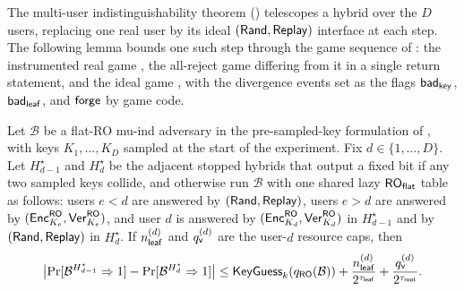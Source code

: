 The multi-user indistinguishability theorem () telescopes a
hybrid over the $D$ users, replacing one real user by its ideal
$(\mathsf{Rand},\mathsf{Replay})$ interface at each step. The following lemma bounds one such
step through the game sequence of : the
instrumented real game \Greal{}, the all-reject game \Grej{} differing from
it in a single return statement, and the ideal game \Gideal{}, with the
divergence events set as the flags $\mathsf{bad}_{\mathsf{key}}$, $\mathsf{bad}_{\mathsf{leaf}}$, and $\mathsf{forge}$ by
game code.

\begin{lemma}
\label{lem:mu-adjacent-hybrid}
Let $\mathcal{B}$ be a flat-RO mu-ind adversary in the pre-sampled-key
formulation of , with keys
$K_1,\dots,K_D$ sampled at the start of the experiment. Fix
$d \in \{1,\dots,D\}$. Let $H_{d-1}^\star$ and $H_d^\star$ be the
adjacent stopped hybrids that output a fixed bit if any two sampled keys
collide, and otherwise run $\mathcal{B}$ with one shared lazy
$\mathsf{RO}_{\mathsf{flat}}$ table as follows: users $e < d$ are answered by
$(\mathsf{Rand},\mathsf{Replay})$, users $e > d$ are answered by
$(\mathsf{Enc}_{K_e}^{\mathsf{RO}},\mathsf{Ver}_{K_e}^{\mathsf{RO}})$, and user $d$ is answered by
$(\mathsf{Enc}_{K_d}^{\mathsf{RO}},\mathsf{Ver}_{K_d}^{\mathsf{RO}})$ in $H_{d-1}^\star$ and by
$(\mathsf{Rand},\mathsf{Replay})$ in $H_d^\star$. If $n_{\mathsf{leaf}}^{(d)}$ and $q_{\mathsf{v}}^{(d)}$
are the user-$d$ resource caps, then
\[
  \bigl|\Pr[\mathcal{B}^{H_{d-1}^\star} \Rightarrow 1]
       - \Pr[\mathcal{B}^{H_d^\star} \Rightarrow 1]\bigr|
  \leq
  \mathsf{KeyGuess}_k(q_{\mathsf{RO}}(\mathcal{B}))
  + \frac{n_{\mathsf{leaf}}^{(d)}}{2^{\tau_{\mathsf{leaf}}}}
  + \frac{q_{\mathsf{v}}^{(d)}}{2^{\tau_{\mathsf{root}}}}.
\]
\end{lemma}

